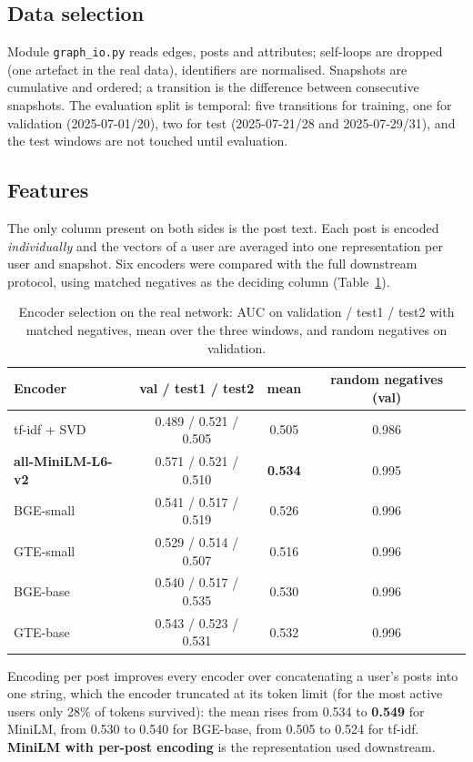 \documentclass[11pt,a4paper]{article}
\newcommand{\code}[1]{\texttt{\small #1}}
\begin{document}
\subsection{Data selection}
Module \code{graph\_io.py} reads edges, posts and attributes; self-loops are dropped (one artefact in the
real data), identifiers are normalised. Snapshots are cumulative and ordered; a transition is the
difference between consecutive snapshots. The evaluation split is temporal: five transitions for
training, one for validation (2025-07-01/20), two for test (2025-07-21/28 and 2025-07-29/31), and the
test windows are not touched until evaluation.

\subsection{Features}
The only column present on both sides is the post text. Each post is encoded \emph{individually} and the
vectors of a user are averaged into one representation per user and snapshot. Six encoders were
compared with the full downstream protocol, using matched negatives as the deciding column
(Table~\ref{tab:encoders}).

\begin{table}[h]
  \centering
  \small
  \caption{Encoder selection on the real network: AUC on validation / test1 / test2 with matched
  negatives, mean over the three windows, and random negatives on validation.}
  \label{tab:encoders}
  \begin{tabular}{@{}lccc@{}}
    \toprule
    Encoder & val / test1 / test2 & mean & random negatives (val) \\
    \midrule
    tf-idf + SVD            & 0.489 / 0.521 / 0.505 & 0.505 & 0.986 \\
    \textbf{all-MiniLM-L6-v2} & 0.571 / 0.521 / 0.510 & \textbf{0.534} & 0.995 \\
    BGE-small               & 0.541 / 0.517 / 0.519 & 0.526 & 0.996 \\
    GTE-small               & 0.529 / 0.514 / 0.507 & 0.516 & 0.996 \\
    BGE-base                & 0.540 / 0.517 / 0.535 & 0.530 & 0.996 \\
    GTE-base                & 0.543 / 0.523 / 0.531 & 0.532 & 0.996 \\
    \bottomrule
  \end{tabular}
\end{table}

Encoding per post improves every encoder over concatenating a user's posts into one string, which the
encoder truncated at its token limit (for the most active users only 28\% of tokens survived): the mean
rises from 0.534 to \textbf{0.549} for MiniLM, from 0.530 to 0.540 for BGE-base, from 0.505 to 0.524 for
tf-idf. \textbf{MiniLM with per-post encoding} is the representation used downstream.
\end{document}
